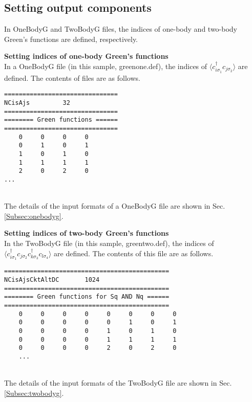 \subsection{Setting output components}
In OneBodyG and TwoBodyG files, the indices of one-body and two-body Green's functions are defined, respectively. 
\begin{description}
\item {\bf Setting indices of one-body Green's functions}\\
  In a OneBodyG file (in this sample, greenone.def),
  the indices of $\langle c_{i\sigma_1}^{\dag}c_{j\sigma_2} \rangle$ are defined.
  The contents of files are as follows.\\
\begin{minipage}{15cm}
\begin{screen}
\begin{verbatim}
===============================
NCisAjs         32
===============================
======== Green functions ======
===============================
    0     0     0     0
    0     1     0     1
    1     0     1     0
    1     1     1     1
    2     0     2     0
...
\end{verbatim}
\end{screen}
\end{minipage}
~\\
The details of the input formats of a OneBodyG file are shown in Sec. \ref{Subsec:onebodyg}.
\item {\bf Setting indices of two-body Green's functions}\\
  In the TwoBodyG file (in this sample, greentwo.def),
  the indices of $\langle c_{i\sigma_1}^{\dag}c_{j\sigma_2}c_{k\sigma_3}^{\dag}c_{l\sigma_4} \rangle$ are defined.
  The contents of this file are as follows.\\
\begin{minipage}{15cm}
\begin{screen}
\begin{verbatim}
=============================================
NCisAjsCktAltDC       1024
=============================================
======== Green functions for Sq AND Nq ======
=============================================
    0     0     0     0     0     0     0     0
    0     0     0     0     0     1     0     1
    0     0     0     0     1     0     1     0
    0     0     0     0     1     1     1     1
    0     0     0     0     2     0     2     0
    ...
\end{verbatim}
\end{screen}
\end{minipage}
~\\
The details of the input formats of the TwoBodyG file are shown in Sec. \ref{Subsec:twobodyg}.
\end{description}

